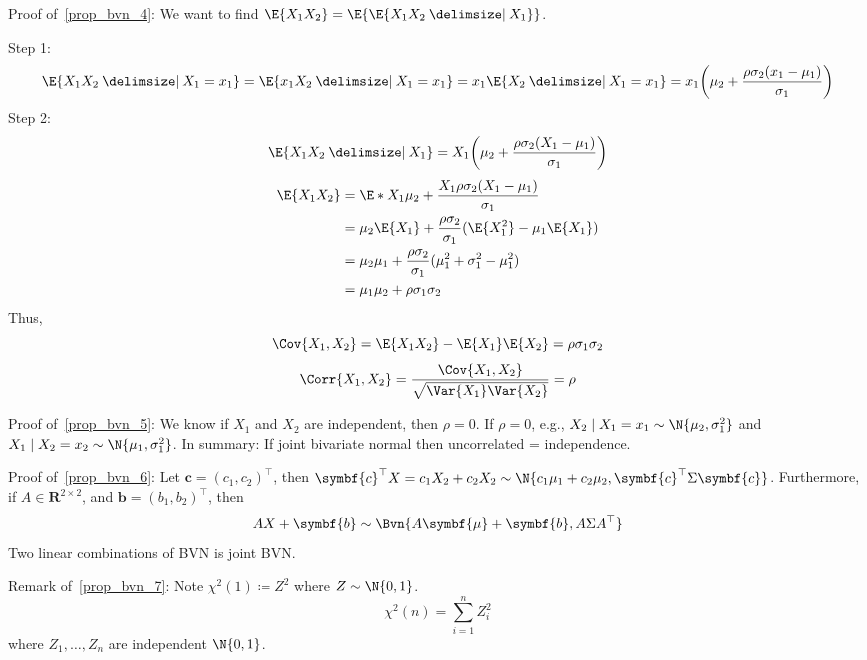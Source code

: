 \begin{Proof}{}{}
    Proof of~\ref{prop_bvn_4}: We want to find $ \E{X_1X_2}=\E{\E{X_1X_2\given X_1}} $.

    Step 1:
    \[ \E{X_1X_2\given X_1=x_1}=\E{x_1X_2\given X_1=x_1}=
        x_1\E{X_2\given X_1=x_1}=x_1
        \biggl(  \mu_2+\frac{\rho\sigma_2(x_1-\mu_1)}{\sigma_1} \biggr) \]
    Step 2:
    \[ \E{X_1X_2\given X_1}=X_1
        \biggl(  \mu_2+\frac{\rho\sigma_2(X_1-\mu_1)}{\sigma_1} \biggr)
    \]
    \begin{align*}
        \E{X_1X_2}
         & = \E*{X_1\mu_2+\frac{X_1\rho\sigma_2(X_1-\mu_1)}{\sigma_1}}            \\
         & =\mu_2\E{X_1}+\frac{\rho\sigma_2}{\sigma_1}
        (\E{X_1^2}-\mu_1\E{X_1})                                                  \\
         & =\mu_2\mu_1+\frac{\rho\sigma_2}{\sigma_1}( \mu_1^2+\sigma_1^2-\mu_1^2) \\
         & =\mu_1\mu_2+\rho\sigma_1\sigma_2
    \end{align*}
    Thus,
    \[ \Cov{X_1,X_2}=\E{X_1X_2}-\E{X_1}\E{X_2}=\rho\sigma_1\sigma_2  \]
    \[ \Corr{X_1,X_2}=\frac{\Cov{X_1,X_2}}{\sqrt{\Var{X_1}\Var{X_2}}}=\rho  \]

    Proof of~\ref{prop_bvn_5}: We know if $ X_1 $ and $ X_2 $ are independent, then $ \rho=0 $.
    If $ \rho=0 $, e.g., $ X_2\mid X_1=x_1 \sim \N{\mu_2,\sigma_1^2} $
    and $ X_1\mid X_2=x_2 \sim \N{\mu_1,\sigma_1^2} $.
    In summary: If joint bivariate normal then uncorrelated = independence.

    Proof of~\ref{prop_bvn_6}: Let $ \symbf{c}=(c_1,c_2)^\top $, then
    $ \symbf{c}^\top X=c_1X_2+c_2X_2 \sim \N{c_1\mu_1+c_2\mu_2,\symbf{c}^\top \Sigma\symbf{c}} $.
    Furthermore, if $ A\in\mathbf{R}^{2\times 2} $, and
    $ \symbf{b}=(b_1,b_2)^\top $, then
    \[ AX+\symbf{b} \sim \Bvn{A\symbf{\mu}+\symbf{b},A\Sigma A^\top} \]
    Two linear combinations of BVN is joint BVN.\
\end{Proof}
\begin{Remark}{}{}
    Remark of~\ref{prop_bvn_7}: Note $ \chi^2(1)\coloneq Z^2 $ where $ Z \sim \N{0,1} $.
    \[ \chi^2(n)=
        \sum_{i=1}^{n} Z_i^2 \]
    where $ Z_1,\ldots,Z_n $ are independent $ \N{0,1} $.
\end{Remark}
